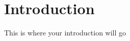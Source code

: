 \documentclass[./dissertation.tex]{subfiles}
\begin{document}
    \section{Introduction}
    This is where your introduction will go
\end{document}
